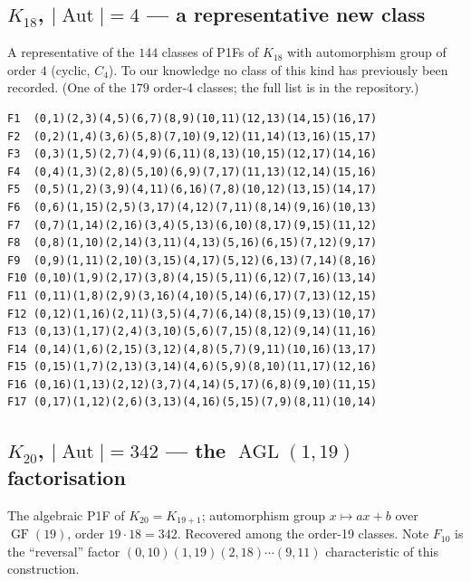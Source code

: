 \documentclass[11pt,reqno]{amsart}
\theoremstyle{plain}
\theoremstyle{definition}
\numberwithin{theorem}{section}
\newcommand{\Aut}{\operatorname{Aut}}
\newcommand{\AGL}{\operatorname{AGL}}
\newcommand{\GF}{\operatorname{GF}}
\begin{document}
\subsection{$K_{18}$, $|\Aut|=4$ --- a representative new class}

A representative of the $144$ classes of P1Fs of $K_{18}$ with automorphism group of
order $4$ (cyclic, $C_4$). To our knowledge no class of this kind has previously been
recorded. (One of the $179$ order-4 classes; the full list is in the repository.)

{\footnotesize\begin{verbatim}
F1  (0,1)(2,3)(4,5)(6,7)(8,9)(10,11)(12,13)(14,15)(16,17)
F2  (0,2)(1,4)(3,6)(5,8)(7,10)(9,12)(11,14)(13,16)(15,17)
F3  (0,3)(1,5)(2,7)(4,9)(6,11)(8,13)(10,15)(12,17)(14,16)
F4  (0,4)(1,3)(2,8)(5,10)(6,9)(7,17)(11,13)(12,14)(15,16)
F5  (0,5)(1,2)(3,9)(4,11)(6,16)(7,8)(10,12)(13,15)(14,17)
F6  (0,6)(1,15)(2,5)(3,17)(4,12)(7,11)(8,14)(9,16)(10,13)
F7  (0,7)(1,14)(2,16)(3,4)(5,13)(6,10)(8,17)(9,15)(11,12)
F8  (0,8)(1,10)(2,14)(3,11)(4,13)(5,16)(6,15)(7,12)(9,17)
F9  (0,9)(1,11)(2,10)(3,15)(4,17)(5,12)(6,13)(7,14)(8,16)
F10 (0,10)(1,9)(2,17)(3,8)(4,15)(5,11)(6,12)(7,16)(13,14)
F11 (0,11)(1,8)(2,9)(3,16)(4,10)(5,14)(6,17)(7,13)(12,15)
F12 (0,12)(1,16)(2,11)(3,5)(4,7)(6,14)(8,15)(9,13)(10,17)
F13 (0,13)(1,17)(2,4)(3,10)(5,6)(7,15)(8,12)(9,14)(11,16)
F14 (0,14)(1,6)(2,15)(3,12)(4,8)(5,7)(9,11)(10,16)(13,17)
F15 (0,15)(1,7)(2,13)(3,14)(4,6)(5,9)(8,10)(11,17)(12,16)
F16 (0,16)(1,13)(2,12)(3,7)(4,14)(5,17)(6,8)(9,10)(11,15)
F17 (0,17)(1,12)(2,6)(3,13)(4,16)(5,15)(7,9)(8,11)(10,14)
\end{verbatim}}

\subsection{$K_{20}$, $|\Aut|=342$ --- the $\AGL(1,19)$ factorisation}

The algebraic P1F of $K_{20}=K_{19+1}$; automorphism group $x\mapsto ax+b$ over
$\GF(19)$, order $19\cdot18=342$. Recovered among the order-19 classes. Note
$F_{10}$ is the ``reversal'' factor $(0,10)(1,19)(2,18)\cdots(9,11)$ characteristic of
this construction.
\end{document}
